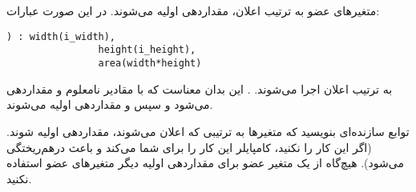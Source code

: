 \section{}
\paragraph{}\label{answer:93}
متغیرهای عضو به ترتیب اعلان، مقداردهی اولیه می‌شوند. در این صورت عبارات:
\begin{LTR}
    \begin{lstlisting}[style=C++Style]
        ) : width(i_width),
                height(i_height),
                area(width*height)
    \end{lstlisting}
\end{LTR}

به ترتیب اعلان اجرا می‌شوند. . این بدان معناست که  با مقادیر نامعلوم  و  مقداردهی می‌شود و سپس  و  مقداردهی اولیه می‌شوند.

توابع سازنده‌ای بنویسید که متغیرها به ترتیبی که اعلان می‌شوند، مقداردهی اولیه شوند. (اگر این کار را نکنید، کامپایلر این کار را برای شما می‌کند و باعث درهم‌ریختگی می‌شود). هیچ‌گاه از یک متغیر عضو برای مقداردهی اولیه دیگر متغیرهای عضو استفاده نکنید.